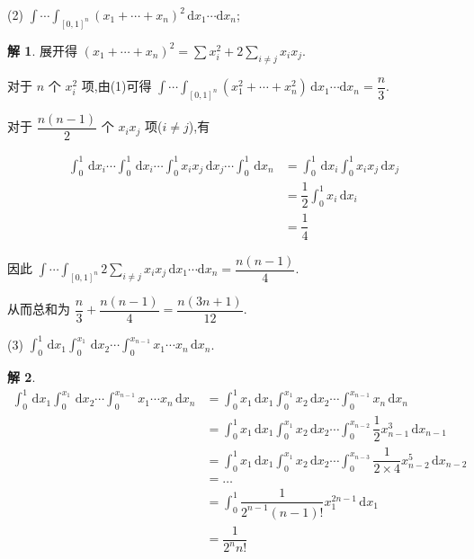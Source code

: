 \documentclass[a4paper,12pt]{article}
\theoremstyle{definition}
\newtheorem*{sol}{解}
\begin{document}
(2) $\displaystyle\int \cdots \int_{[0,1]^n} (x_1 + \cdots + x_n)^2 \, \mathrm{d}x_1 \cdots \mathrm{d}x_n$;
\begin{sol}
    展开得 $(x_1 + \cdots + x_n)^2=\sum x_i^2+2\sum_{i\neq j}x_ix_j$.

    对于 $n$ 个 $x_i^2$ 项,由(1)可得 $\int \cdots \int_{[0,1]^n} (x_1^2 + \cdots + x_n^2) \, \mathrm{d}x_1 \cdots \mathrm{d}x_n=\dfrac{n}{3}$.

    对于 $\dfrac{n(n-1)}{2}$ 个 $x_ix_j$ 项($i\neq j$),有

    \begin{align*}
        \int_0^1\,\mathrm{d}x_i\cdots\int_0^1\,\mathrm{d}x_i\cdots\int_0^1x_ix_j\,\mathrm{d}x_j\cdots\int_0^1\,\mathrm{d}x_n
         & =\int_0^1\,\mathrm{d}x_i\int_0^1x_ix_j\,\mathrm{d}x_j \\
         & =\dfrac{1}{2}\int_0^1 x_i\,\mathrm{d}x_i               \\
         & =\dfrac{1}{4}
    \end{align*}

    因此 $\int \cdots \int_{[0,1]^n} 2\sum_{i\neq j}x_ix_j \, \mathrm{d}x_1 \cdots \mathrm{d}x_n=\dfrac{n(n-1)}{4}$.

    从而总和为 $\dfrac{n}{3}+\dfrac{n(n-1)}{4}=\dfrac{n(3n+1)}{12}$.
\end{sol}

(3) $\displaystyle\int_{0}^{1}\,\mathrm{d}x_1 \int_{0}^{x_1}\,\mathrm{d}x_2 \cdots \int_{0}^{x_{n-1}} x_1 \cdots x_n \, \mathrm{d}x_n$.
\begin{sol}
    \begin{align*}
        \int_{0}^{1}\,\mathrm{d}x_1 \int_{0}^{x_1}\,\mathrm{d}x_2 \cdots \int_{0}^{x_{n-1}} x_1 \cdots x_n \, \mathrm{d}x_n
         & =\int_{0}^{1}x_1\,\mathrm{d}x_1 \int_{0}^{x_1}x_2\,\mathrm{d}x_2 \cdots \int_{0}^{x_{n-1}} x_n \, \mathrm{d}x_n                              \\
         & =\int_{0}^{1}x_1\,\mathrm{d}x_1 \int_{0}^{x_1}x_2\,\mathrm{d}x_2 \cdots \int_{0}^{x_{n-2}} \dfrac{1}{2}x_{n-1}^3 \, \mathrm{d}x_{n-1}         \\
         & =\int_{0}^{1}x_1\,\mathrm{d}x_1 \int_{0}^{x_1}x_2\,\mathrm{d}x_2 \cdots \int_{0}^{x_{n-3}} \dfrac{1}{2\times 4}x_{n-2}^5 \, \mathrm{d}x_{n-2} \\
         & =\dots                                                                                                                                       \\
         & =\int_0^1\dfrac{1}{2^{n-1}(n-1)!}x_1^{2n-1}\,\mathrm{d}x_1                                                                                    \\
         & =\dfrac{1}{2^nn!}
    \end{align*}
\end{sol}
\end{document}
